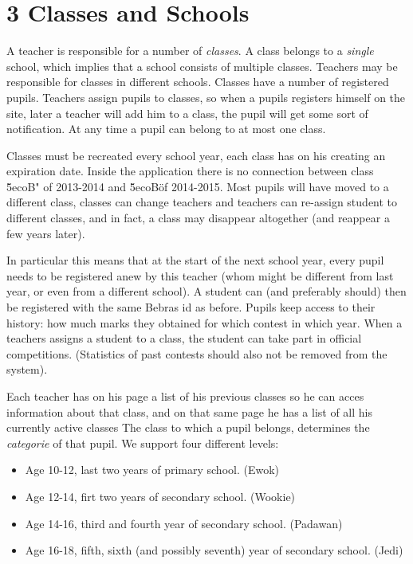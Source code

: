 
\section*{3 Classes and Schools}

A teacher is responsible for a number of \emph{classes}. A class belongs to a \emph{single} school, which implies that a school consists of multiple classes. Teachers may be responsible for classes in different schools. Classes have a number of registered pupils. Teachers assign pupils to classes, so when a pupils registers himself on the site, later a teacher will add him to a class, the pupil will get some sort of notification. At any time a pupil can belong to at most one class. 

Classes must be recreated every school year, each class has on his creating an expiration date. Inside the application there is no connection between class \"5ecoB" of 2013-2014 and \"5ecoB\" of 2014-2015. Most pupils will have moved to a different class, classes can change teachers and teachers can re-assign student to different classes, and in fact, a class may disappear altogether (and reappear a few years later).

In particular this means that at the start of the next school year, every pupil needs to be registered anew by this teacher (whom might be different from last year, or even from a different school). A student can (and preferably should) then be registered with the same Bebras id as before. Pupils keep access to their history: how much marks they obtained for which contest in which year. 
When a teachers assigns a student to a class, the student can take part in official competitions.
(Statistics of past contests should also not be removed from the system).

Each teacher has on his page a list of his previous classes so he can acces information about that class, and on that same page he has a list of all his currently active classes
The class to which a pupil belongs, determines the \emph{categorie} of that pupil. We support four different levels:
\begin{itemize}
\item Age 10-12, last two years of primary school. (Ewok)
\item Age 12-14, firt two years of secondary school. (Wookie)
\item Age 14-16, third and fourth year of secondary school. (Padawan)
\item Age 16-18, fifth, sixth (and possibly seventh) year of secondary school. (Jedi)
\end{itemize}

